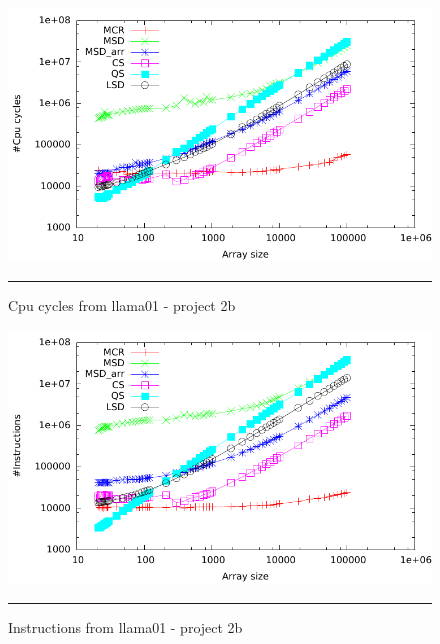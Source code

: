 \begin{figure}[ht]
	\centering
		\includegraphics[width=\textwidth]{./Appendices/Figures/Project2b/Cpu_cycles.pdf}
		\rule{35em}{0.5pt}
	\caption*{
	Cpu cycles from llama01 - project 2b
	}
	\label{fig:Cpu_cycles_p2b_putty}
\end{figure}
\begin{figure}[ht]
	\centering
		\includegraphics[width=\textwidth]{./Appendices/Figures/Project2b/Instructions.pdf}
		\rule{35em}{0.5pt}
	\caption*{
	Instructions from llama01 - project 2b
	}
	\label{fig:Instructions_p2b_putty}
\end{figure}